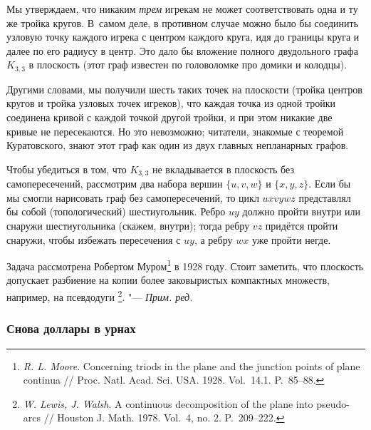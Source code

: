 \documentclass[twoside]{book}
\newenvironment{addedbytheeditors}{\par\medskip\small
}{\par\addvspace{\medskipamount}} %
\begin{document}
Мы утверждаем, что никаким \emph{трем} игрекам не может
соответствовать одна и ту же тройка кругов. В~самом деле, в противном случае
можно было бы соединить узловую точку каждого игрека с центром каждого
круга, идя до границы круга и далее по его радиусу
в центр.
Это дало бы вложение полного двудольного графа $K_{3,3}$ в
плоскость (этот граф известен по головоломке про домики и колодцы).

Другими словами, мы получили шесть таких точек на плоскости (тройка
центров кругов и тройка узловых точек игреков), что каждая точка из
одной тройки соединена кривой с каждой точкой другой тройки, и при
этом никакие две кривые не пересекаются.
Но это невозможно; читатели,
знакомые с теоремой Куратовского, знают этот граф как один из двух
главных непланарных графов.

Чтобы убедиться в том, что $K_{3,3}$ не вкладывается в плоскость без
самопересечений, рассмотрим два набора вершин $\{u, v, w\}$ и $\{x, y,
z\}$.
Если бы мы смогли нарисовать граф без самопересечений, то цикл
$uxvywz$ представлял бы собой (топологический) шестиугольник.
Ребро
$uy$ должно пройти внутри или снаружи шестиугольника (скажем, внутри);
тогда ребру $vz$ придётся пройти снаружи, чтобы избежать пересечения с
$uy$, а ребру $wx$ уже пройти негде. \heart

\begin{addedbytheeditors}

Задача рассмотрена Робертом Муром\footnote{\emph{R. L. Moore}. Concerning triods in the plane and the junction points of plane continua /\!/ {Proc. Natl. Acad. Sci. USA}. 1928. Vol.~14.1. P.~85--88.} в 1928 году.
Стоит заметить, что плоскость допускает разбиение на копии более заковыристых компактных множеств, например, на псевдодуги%
\footnote{\emph{W. Lewis, J. Walsh}. 
A continuous decomposition of the plane into pseudo-arcs /\!/
Houston J. Math. 1978. Vol.~4, no. 2. P.~209--222.}. 
"--- \emph{Прим. ред.} 
\end{addedbytheeditors}


\subsubsection*{Снова  доллары в урнах}
\end{document}
